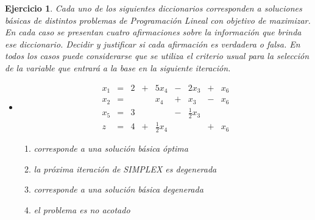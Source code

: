 \documentclass[a4paper,oneside,12pt]{amsart}
\newtheorem{quest}{Ejercicio}
\begin{document}

\begin{quest}
Cada uno de los siguientes diccionarios corresponden a soluciones básicas de distintos problemas de Programación Lineal con objetivo de maximizar. 
En cada caso se presentan cuatro afirmaciones sobre la información que brinda ese diccionario. Decidir y justificar si cada afirmación es verdadera o falsa. En todos los casos puede considerarse que se utiliza el criterio usual para la selección de la variable que entrará a la base en la siguiente iteración.
\begin{itemize}
    \item[(1)]
            \[\begin{array}{rrrrrrrrr}
                x_1 & = & 2 & + & 5x_4 & - & 2x_3 & + & x_6 \\
                x_2&=&&&x_4&+&x_3&-&x_6\\ 
                x_5&=&3&&&-&\frac{1}{2}x_3&&\\ \hline
                z&=&4&+&\frac{1}{2}x_4&&&+& x_6
            \end{array}\]
            \begin{enumerate}
                \item[(a)] corresponde a una solución básica óptima
                \item[(b)] la próxima iteración de SIMPLEX es degenerada
                \item[(c)] corresponde a una solución básica degenerada
                \item[(d)] el problema es no acotado
            \end{enumerate}

\end{itemize}
\end{quest}
\end{document}
